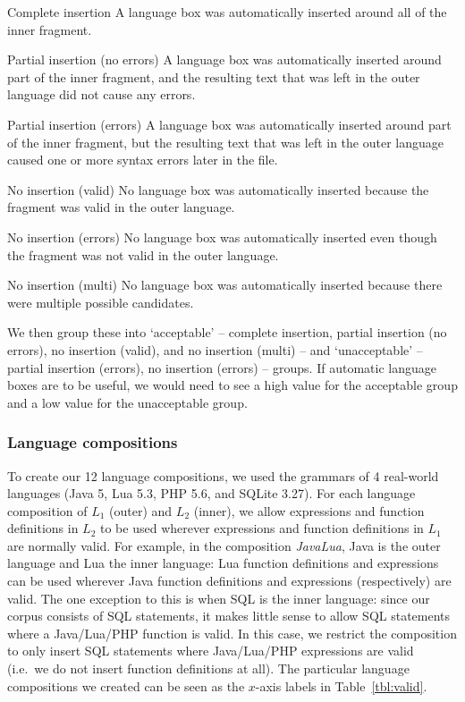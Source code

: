 \documentclass[sigplan,screen]{acmart}\settopmatter{printfolios=true,printccs=false,printacmref=false}
\begin{document}
\begin{description*}
  \item[Complete insertion] A language box was automatically inserted around
    all of the inner fragment.
  \item[Partial insertion (no errors)] A language box was automatically
    inserted around part of the inner fragment, and the resulting text that was left
    in the outer language did not cause any errors.
  \item[Partial insertion (errors)] A language box was automatically inserted
    around part of the inner fragment, but the resulting text that was left
    in the outer language caused one or more syntax errors later in the file.
  \item[No insertion (valid)] No language box was automatically inserted because
    the fragment was valid in the outer language.
  \item[No insertion (errors)] No language box was automatically inserted even
    though the fragment was not valid in the outer language.
  \item[No insertion (multi)] No language box was automatically inserted because
    there were multiple possible candidates.
\end{description*}

We then group these into `acceptable' -- complete insertion, partial insertion
(no errors), no insertion (valid), and no insertion (multi) -- and
`unacceptable' -- partial insertion (errors), no insertion (errors) -- groups.
If automatic language boxes are to be useful, we would need to see a high value
for the acceptable group and a low value for the unacceptable group.


\subsubsection{Language compositions}

To create our 12 language compositions, we used the grammars of 4 real-world
languages (Java 5, Lua 5.3, PHP 5.6, and SQLite 3.27).
For each language composition of $L_1$ (outer) and $L_2$ (inner), we allow
expressions and function definitions in $L_2$ to be used wherever expressions
and function definitions in $L_1$ are normally valid. For example, in the
composition \emph{JavaLua}, Java is the outer language and Lua the inner
language: Lua function definitions and expressions can be used wherever Java
function definitions and expressions (respectively) are valid. The one exception
to this is when SQL is the inner language: since our corpus consists of SQL
statements, it makes little sense to allow SQL statements where a Java/Lua/PHP
function is valid. In this case, we restrict the composition to only insert SQL
statements where Java/Lua/PHP expressions are valid (i.e.~we do not insert
function definitions at all). The
particular language compositions we created can be seen as the $x$-axis labels
in Table~\ref{tbl:valid}.
\end{document}
